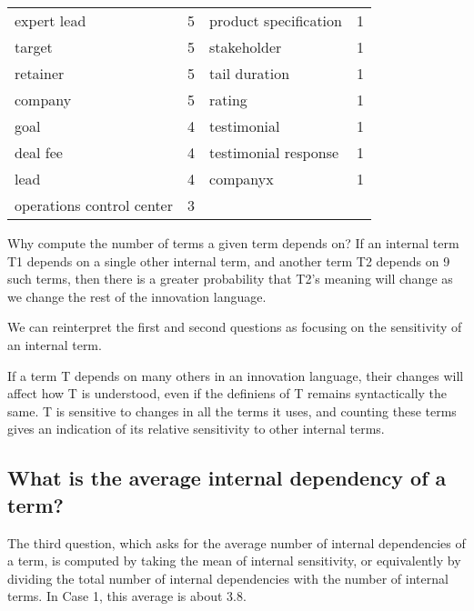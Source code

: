 \begin{longtable}{@{}llll@{}}
expert lead                & 5                    & product specification & 1                    \\
target                     & 5                    & stakeholder           & 1                    \\
retainer                   & 5                    & tail duration         & 1                    \\
company                    & 5                    & rating                & 1                    \\
goal                       & 4                    & testimonial           & 1                    \\
deal fee                   & 4                    & testimonial response  & 1                    \\
lead                       & 4                    & companyx              & 1                    \\
operations control center  & 3                    &                       &                      \\* \bottomrule
\end{longtable}

Why compute the number of terms a given term depends on? If an internal term T1 depends on a single other internal term, and another term T2 depends on 9 such terms, then there is a greater probability that T2's meaning will change as we change the rest of the innovation language.

We can reinterpret the first and second questions as focusing on the sensitivity of an internal term.

If a term T depends on many others in an innovation language, their changes will affect how T is understood, even if the definiens of T remains syntactically the same. T is sensitive to changes in all the terms it uses, and counting these terms gives an indication of its relative sensitivity to other internal terms.


\subsection{What is the average internal dependency of a term?}
\label{c7:s3:ss3}
The third question, which asks for the average number of internal dependencies of a term, is computed by taking the mean of internal sensitivity, or equivalently by dividing the total number of internal dependencies with the number of internal terms. In Case 1, this average is about 3.8.

